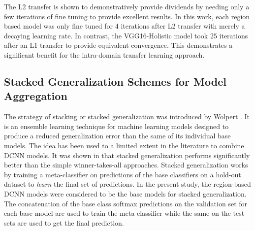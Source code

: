 \documentclass[10pt,conference,a4paper]{IEEEtran}
\begin{document}
The L2 transfer is shown to demonstratively provide dividends by needing only a few iterations of fine tuning to provide excellent results. In this work, each region based model was only fine tuned for 4 iterations after L2 transfer with merely a decaying learning rate. In contrast, the VGG16-Holistic model took 25 iterations after an L1 transfer to provide equivalent convergence. This demonstrates a significant benefit for the intra-domain transfer learning approach.

\subsection{Stacked Generalization Schemes for Model Aggregation}
The strategy of stacking or stacked generalization was introduced by Wolpert \cite{wolpert1992}. It is an ensemble learning technique for machine learning models designed to produce a reduced generalization error than the same of its individual base models. The idea has been used to a limited extent in the literature to combine DCNN models. It was shown in \cite{roy2016generalized} that stacked generalization performs significantly better than the simple winner-takes-all approaches.
Stacked generalization works by training a meta-classifier on predictions of the base classifiers on a hold-out dataset to \textit{learn} the final set of predictions. In the present study, the region-based DCNN models were considered to be the base models for stacked generalization. The concatenation of the base class softmax predictions on the validation set for each base model are used to train the meta-classifier while the same on the test sets are used to get the final prediction.
\end{document}

